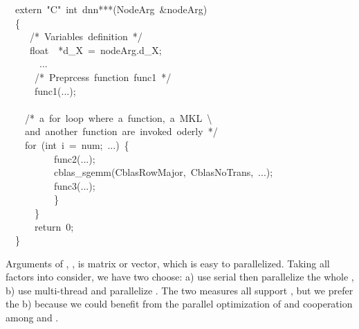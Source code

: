 \documentclass{article}
\begin{document}
\begin{mdpre}%
\noindent~~extern~{"}{C}{"}~{int}~dnn***({NodeArg}~\&nodeArg)\\
~~\{\\
~~~~~{/*}{~Variables~definition~}{*/}\\
~~~~~{float}~~*d\_X~=~nodeArg.d\_X;\\
~~~~~~~...\\
~~~~~~{/*}{~Preprcess~function~func1~}{*/}\\
~~~~~~func1(...);\\
\\
~~~~{/*}{~a~for~loop~where~a~function,~a~MKL~\textbackslash{}}\\
{~~~~and~another~function~are~invoked~oderly~}{*/}\\
~~~~{for}~({int}~i~=~num;~...)~\{\\
~~~~~~~~~~func2(...);\\
~~~~~~~~~~cblas\_sgemm({CblasRowMajor},~{CblasNoTrans},~...);\\
~~~~~~~~~~func3(...);\\
~~~~~~~~~~\}\\
~~~~~~\}~\\
~~~~~~{return}~{0};\\
~~\}\\
\end{mdpre}\noindent{}Arguments of , ,  is matrix or vector, which is easy to parallelized. Taking all factors into consider, we have two choose: a) use serial  then parallelize the whole , b) use multi-thread  and parallelize . The two measures all support , but we prefer the b) because we could benefit from the parallel optimization of  and cooperation among  and .
\end{document}

